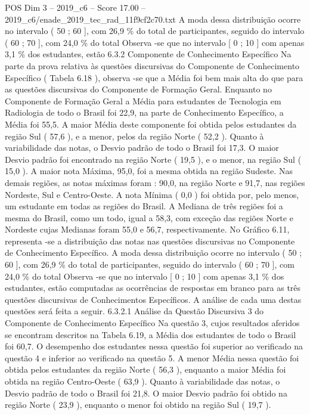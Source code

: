\begin{textsample}{POS Dim 3 – 2019\_c6 – Score 17.00 – 2019\_c6/enade\_2019\_tec\_rad\_11f9cf2c70.txt}
A moda dessa distribuição ocorre no intervalo ( 50 ; 60 ], com 26,9 \% do total de participantes, seguido do intervalo ( 60 ; 70 ], com 24,0 \% do total Observa -se que no intervalo [ 0 ; 10 ] com apenas 3,1 \% dos estudantes, estão 6.3.2 Componente de Conhecimento Específico Na parte da prova relativa às questões discursivas do Componente de Conhecimento Específico ( Tabela 6.18 ), observa -se que a Média foi bem mais alta do que para as questões discursivas do Componente de Formação Geral.
Enquanto no Componente de Formação Geral a Média para estudantes de Tecnologia em Radiologia de todo o Brasil foi 22,9, na parte de Conhecimento Específico, a Média foi 55,5.
A maior Média deste componente foi obtida pelos estudantes da região Sul ( 57,6 ), e a menor, pelos da região Norte ( 52,2 ).
Quanto à variabilidade das notas, o Desvio padrão de todo o Brasil foi 17,3.
O maior Desvio padrão foi encontrado na região Norte ( 19,5 ), e o menor, na região Sul ( 15,0 ).
A maior nota Máxima, 95,0, foi a mesma obtida na região Sudeste.
Nas demais regiões, as notas máximas foram : 90,0, na região Norte e 91,7, nas regiões Nordeste, Sul e Centro-Oeste.
A nota Mínima ( 0,0 ) foi obtida por, pelo menos, um estudante em todas as regiões do Brasil.
A Mediana de três regiões foi a mesma do Brasil, como um todo, igual a 58,3, com exceção das regiões Norte e Nordeste cujas Medianas foram 55,0 e 56,7, respectivamente.
No Gráfico 6.11, representa -se a distribuição das notas nas questões discursivas no Componente de Conhecimento Específico.
A moda dessa distribuição ocorre no intervalo ( 50 ; 60 ], com 26,9 \% do total de participantes, seguido do intervalo ( 60 ; 70 ], com 24,0 \% do total Observa -se que no intervalo [ 0 ; 10 ] com apenas 3,1 \% dos estudantes, estão computadas as ocorrências de respostas em branco para as três questões discursivas de Conhecimentos Específicos.
A análise de cada uma destas questões será feita a seguir. 6.3.2.1 Análise da Questão Discursiva 3 do Componente de Conhecimento Específico Na questão 3, cujos resultados aferidos se encontram descritos na Tabela 6.19, a Média dos estudantes de todo o Brasil foi 60,7.
O desempenho dos estudantes nessa questão foi superior ao verificado na questão 4 e inferior ao verificado na questão 5.
A menor Média nessa questão foi obtida pelos estudantes da região Norte ( 56,3 ), enquanto a maior Média foi obtida na região Centro-Oeste ( 63,9 ).
Quanto à variabilidade das notas, o Desvio padrão de todo o Brasil foi 21,8.
O maior Desvio padrão foi obtido na região Norte ( 23,9 ), enquanto o menor foi obtido na região Sul ( 19,7 ).

\end{textsample}
